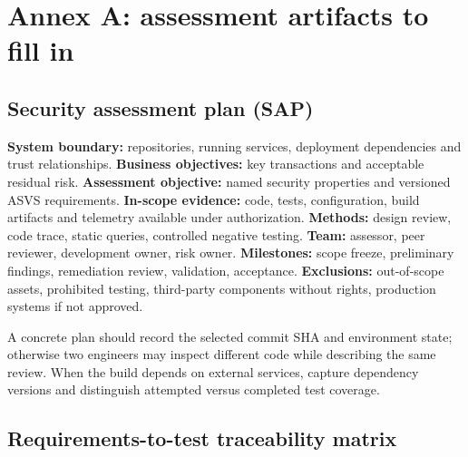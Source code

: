 \documentclass[
  letterpaper,
]{article}
\begin{document}
\section{Annex A: assessment artifacts to fill
in}\label{annex-a-assessment-artifacts-to-fill-in}

\subsection{Security assessment plan
(SAP)}\label{security-assessment-plan-sap}

\textbf{System boundary:} repositories, running services, deployment
dependencies and trust relationships. \textbf{Business objectives:} key
transactions and acceptable residual risk. \textbf{Assessment
objective:} named security properties and versioned ASVS requirements.
\textbf{In-scope evidence:} code, tests, configuration, build artifacts
and telemetry available under authorization. \textbf{Methods:} design
review, code trace, static queries, controlled negative testing.
\textbf{Team:} assessor, peer reviewer, development owner, risk owner.
\textbf{Milestones:} scope freeze, preliminary findings, remediation
review, validation, acceptance. \textbf{Exclusions:} out-of-scope
assets, prohibited testing, third-party components without rights,
production systems if not approved.

A concrete plan should record the selected commit SHA and environment
state; otherwise two engineers may inspect different code while
describing the same review. When the build depends on external services,
capture dependency versions and distinguish attempted versus completed
test coverage.

\subsection{Requirements-to-test traceability
matrix}\label{requirements-to-test-traceability-matrix}
\end{document}
